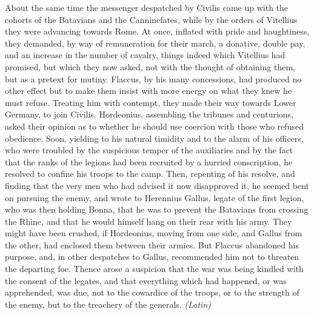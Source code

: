 About the same time the messenger despatched by Civilis came up with the cohorts of the Batavians and the Canninefates, while by the orders of Vitellius they were advancing towards Rome. At once, inflated with pride and haughtiness, they demanded, by way of remuneration for their march, a donative, double pay, and an increase in the number of cavalry, things indeed which Vitellius had promised, but which they now asked, not with the thought of obtaining them, but as a pretext for mutiny. Flaccus, by his many concessions, had produced no other effect but to make them insist with more energy on what they knew he must refuse. Treating him with contempt, they made their way towards Lower Germany, to join Civilis. Hordeonius, assembling the tribunes and centurions, asked their opinion as to whether he should use coercion with those who refused obedience. Soon, yielding to his natural timidity and to the alarm of his officers, who were troubled by the suspicious temper of the auxiliaries and by the fact that the ranks of the legions had been recruited by a hurried conscription, he resolved to confine his troops to the camp. Then, repenting of his resolve, and finding that the very men who had advised it now disapproved it, he seemed bent on pursuing the enemy, and wrote to Herennius Gallus, legate of the first legion, who was then holding Bonna, that he was to prevent the Batavians from crossing the Rhine, and that he would himself hang on their rear with his army. They might have been crushed, if Hordeonius, moving from one side, and Gallus from the other, had enclosed them between their armies. But Flaccus abandoned his purpose, and, in other despatches to Gallus, recommended him not to threaten the departing foe. Thence arose a suspicion that the war was being kindled with the consent of the legates, and that everything which had happened, or was apprehended, was due, not to the cowardice of the troops, or to the strength of the enemy, but to the treachery of the generals. \emph{(Latin)}


